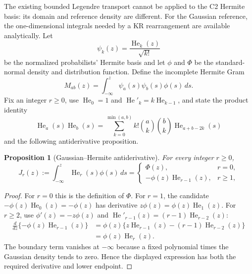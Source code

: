 \documentclass[11pt]{article}
\newtheorem{proposition}{Proposition}
\begin{document}
The existing bounded Legendre transport cannot be applied to the C2 Hermite
basis: its domain and reference density are different. For the Gaussian
reference, the one-dimensional integrals needed by a KR rearrangement are
available analytically. Let
\[
\psi_k(z)=\frac{\operatorname{He}_k(z)}{\sqrt{k!}}
\]
be the normalized probabilists' Hermite basis and let $\phi$ and $\Phi$ be the
standard-normal density and distribution function. Define the incomplete
Hermite Gram
\begin{equation}\label{eq:incomplete-hermite-gram}
M_{ab}(z)=\int_{-\infty}^{z}\psi_a(s)\psi_b(s)\phi(s)\,ds.
\end{equation}
Fix an integer $r\geq0$, use $\operatorname{He}_0=1$ and
$\operatorname{He}'_k=k\operatorname{He}_{k-1}$, and state the product identity
\begin{equation}\label{eq:hermite-product}
\operatorname{He}_a(s)\operatorname{He}_b(s)
=\sum_{k=0}^{\min(a,b)}
k!\binom{a}{k}\binom{b}{k}
\operatorname{He}_{a+b-2k}(s)
\end{equation}
and the following antiderivative proposition.
\begin{proposition}[Gaussian--Hermite antiderivative]
\label{prop:hermite-antiderivative}
For every integer $r\geq0$,
\begin{equation}\label{eq:hermite-antiderivative}
J_r(z):=\int_{-\infty}^{z}\operatorname{He}_r(s)\phi(s)\,ds
=\begin{cases}
\Phi(z),&r=0,\\
-\phi(z)\operatorname{He}_{r-1}(z),&r\geq1,
\end{cases}
\end{equation}
\end{proposition}
\begin{proof}
For $r=0$ this is the definition of $\Phi$. For $r=1$, the candidate
$-\phi(z)\operatorname{He}_0(z)=-\phi(z)$ has derivative
$z\phi(z)=\phi(z)\operatorname{He}_1(z)$. For $r\geq2$, use
$\phi'(z)=-z\phi(z)$ and
$\operatorname{He}'_{r-1}(z)=(r-1)\operatorname{He}_{r-2}(z)$:
\begin{align}
\frac{d}{dz}\{-\phi(z)\operatorname{He}_{r-1}(z)\}
&=\phi(z)\{z\operatorname{He}_{r-1}(z)
 -(r-1)\operatorname{He}_{r-2}(z)\}\nonumber\\
&=\phi(z)\operatorname{He}_{r}(z).
\end{align}
The boundary term vanishes at $-\infty$ because a fixed polynomial times the
Gaussian density tends to zero. Hence the displayed expression has both the
required derivative and lower endpoint.
\end{proof}
\end{document}

